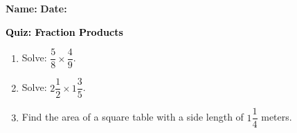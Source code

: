 \documentclass[12pt, letterpaper, fleqn]{article}
\begin{document}
\textbf{Name:} \underline{\hspace{5cm}}
\hfill
\textbf{Date:} \underline{\hspace{3cm}}\\

\begin{tcolorbox}[colback=customteal!20]
    \large\textcolor{black}{\textbf{Quiz: Fraction Products}}
\end{tcolorbox}
\begin{enumerate}[itemsep=3.5cm, leftmargin=0.6cm]
\item Solve: $\dfrac{5}{8} \times \dfrac{4}{9}$.
\vspace{3.5cm}
\item Solve: $2\dfrac{1}{2} \times 1\dfrac{3}{5}$.
\vspace{3.5cm}
\item Find the area of a square table with a side length of $1\dfrac{1}{4}$ meters.
\end{enumerate}
\end{document}

